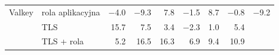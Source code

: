 \begin{tabular}{llrrrrrrr}
\midrule
Valkey & rola aplikacyjna & \num[print-implicit-plus]{-4.0} & \num[print-implicit-plus]{-9.3} & \num[print-implicit-plus]{+7.8} & \num[print-implicit-plus]{-1.5} & \num[print-implicit-plus]{+8.7} & \num[print-implicit-plus]{-0.8} & \num[print-implicit-plus]{-9.2} \\
 & TLS & \num[print-implicit-plus]{+15.7} & \num[print-implicit-plus]{+7.5} & \num[print-implicit-plus]{+3.4} & \num[print-implicit-plus]{-2.3} & \num[print-implicit-plus]{+1.0} & \num[print-implicit-plus]{+5.4} & \\
 & TLS + rola & \num[print-implicit-plus]{+5.2} & \num[print-implicit-plus]{+16.5} & \num[print-implicit-plus]{+16.3} & \num[print-implicit-plus]{+6.9} & \num[print-implicit-plus]{+9.4} & \num[print-implicit-plus]{+10.9} & \\
\bottomrule
\end{tabular}
